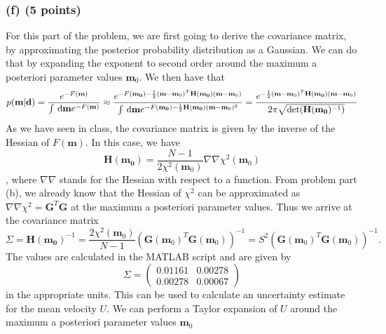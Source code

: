 \documentclass[11pt]{article}
\begin{document}
\subsubsection*{(f) (5 points)}
For this part of the problem, we are first going to derive the covariance matrix, by approximating the posterior probability distribution as a Gaussian. We can do that by expanding the exponent to second order around the maximum a posteriori parameter values $\mathbf{m}_0$. We then have
that
\begin{equation}
p(\mathbf{m}|\mathbf{d}) = \frac{e^{-F(\mathbf{m})}}{\int \, \text{d}\mathbf{m} e^{-F(\mathbf{m})}}
\approx \frac{e^{-F(\mathbf{m_0})-\frac{1}{2}(\mathbf{m} - \mathbf{m}_0)^T\mathbf{H}(\mathbf{m_0})(\mathbf{m} - \mathbf{m}_0)}}{\int \, \text{d}\mathbf{m} e^{-F(\mathbf{m_0})-\frac{1}{2}\mathbf{H}(\mathbf{m_0})(\mathbf{m} - \mathbf{m}_0)^2}}
=\frac{e^{-\frac{1}{2}(\mathbf{m} - \mathbf{m}_0)^T\mathbf{H}(\mathbf{m_0})(\mathbf{m} - \mathbf{m}_0)}}{2\pi\sqrt{\text{det}(\mathbf{H}(\mathbf{m_0})^{-1})}}
\end{equation}
As we have seen in class, the covariance matrix is given by the inverse of the Hessian of $F(\mathbf{m})$. In this case, we have
\begin{equation}
\mathbf{H}(\mathbf{m_0}) = \frac{N-1}{2\chi^2(\mathbf{m}_0)}\nabla\nabla \chi^2(\mathbf{m}_0)
\end{equation}, 
where $\nabla \nabla$ stands for the Hessian with respect to a function. From problem part (b), we already know that the Hessian of $\chi^2$ can be approximated as $\nabla\nabla\chi^2 =\mathbf{G}^T\mathbf{G}$ at the maximum a posteriori parameter values. Thus we arrive at the covariance matrix
\begin{equation}
\Sigma = \mathbf{H}(\mathbf{m_0})^{-1} = \frac{2\chi^2(\mathbf{m}_0)}{N-1}\left(\mathbf{G}(\mathbf{m}_0)^T\mathbf{G}(\mathbf{m}_0)\right)^{-1} = S^2 \left(\mathbf{G}(\mathbf{m}_0)^T\mathbf{G}(\mathbf{m}_0)\right)^{-1}.
\end{equation}
The values are calculated in the MATLAB script and are given by
\begin{equation}
\Sigma = 
\begin{pmatrix}
0.01161 & 0.00278\\
0.00278 & 0.00067
\end{pmatrix}
\end{equation}
in the appropriate units. This can be used to calculate an uncertainty estimate for the mean velocity $U$. We can perform a Taylor expansion of $U$ around the maximum a posteriori parameter values $\mathbf{m}_0$
\end{document}
